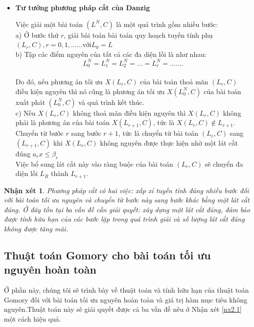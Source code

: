 \documentclass[12pt,a4paper]{report}
\newtheorem{nx}{Nhận xét}
\begin{document}
\begin{itemize}
\begin{figure}[h]
    \end{figure}
    \newpage
\item \textbf{Tư tưởng phương pháp cắt của Danzig}
    
    Việc giải một bài toán $(L^N,C)$ là một quá trình gồm nhiều bước:\\
a) Ở bước thứ $r$,  giải bài toán bài toán quy hoạch tuyến tính phụ 
 $(L_r,C), r = 0,1,... 
… \text{với}   L_0=L $\\
b) Tập các điểm  nguyên của tất cả các đa diện lồi là như nhau:
$$L_0^N=L_1^N=L_2^N=...=L_r^N=.......$$\\
Do đó, nếu phương án tối ưu $X(L_r,C)$ của bài toán thoả mãn $(L_r,C)$ điều kiện 
nguyên thì nó cũng là phương án tối ưu $X(L_0^N,C)$ của bài toán xuất phát $(L_0^N,C)$ và quá trình kết thúc.\\
c)  Nếu $X(L_r,C)$ không thoả mãn điều kiện nguyên thì $X(L_r,C)$ không phải là 
phương án của bài toán $X(L_{r+1},C)$, tức là $X(L_r,C)\notin L_{r+1}$.\\Chuyển từ bước $r$ sang bước $r+1$, tức là chuyển từ bài toán $(L_r,C)$ sang 
 $(L_{r+1},C)$ khi $X(L_r,C)$ không nguyên được thực hiện nhờ một lát cắt đúng $a_rx \le \beta_r$\\
Việc bổ sung lát cắt này vào ràng buộc của bài toán $(L_r,C)$ sẽ chuyển đa diện lồi $L_R$ thành $L_{r+1}$.\\
    
\end{itemize}
\begin{nx}\label{nx2.1}
    Phương pháp cắt có hai việc: xấp xỉ tuyến tính đúng nhiều bước đối với bài toán tối ưu nguyên và chuyển từ bước này sang bước khác bằng một lát cắt đúng. Ở đây tồn tại ba vấn đề cần giải quyết: xây dựng một lát cắt đúng, đảm bảo được tính hữu hạn của các bước lặp trong quá trình giải và số lượng lát cắt đúng không được tăng mãi.
\end{nx}
\subsection{ Thuật toán Gomory cho bài toán tối ưu nguyên hoàn toàn}
Ở phần này, chúng tôi sẽ trình bày về thuật toán và tính hữu hạn của thuật toán Gomory đối với bài toán tối ưu nguyên hoàn toàn và giá trị hàm mục tiêu không nguyên.Thuật toán này sẽ giải quyết được cả ba vấn đề nêu ở Nhận xét \eqref{nx2.1} một cách hiệu quả.\\
\end{document}
